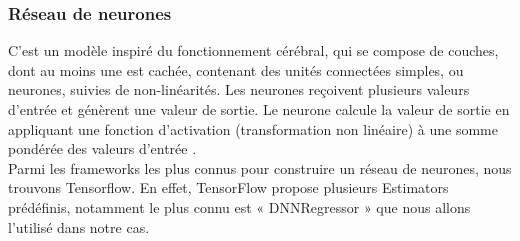 \subsubsection{Réseau de neurones}
C'est un modèle inspiré du fonctionnement cérébral, qui se compose de couches, dont au moins une est cachée, contenant des unités connectées simples, ou neurones, suivies de non-linéarités.
Les neurones reçoivent plusieurs valeurs d'entrée et génèrent une valeur de sortie. Le neurone calcule la valeur de sortie en appliquant une fonction d'activation (transformation non linéaire) à une somme pondérée des valeurs d'entrée \cite{NeuralNetwork}.\\
Parmi les frameworks les plus connus pour construire un réseau de neurones, nous trouvons Tensorflow. En effet, TensorFlow propose plusieurs Estimators prédéfinis, notamment le plus connu est « DNNRegressor » que nous allons l’utilisé dans notre cas. 
